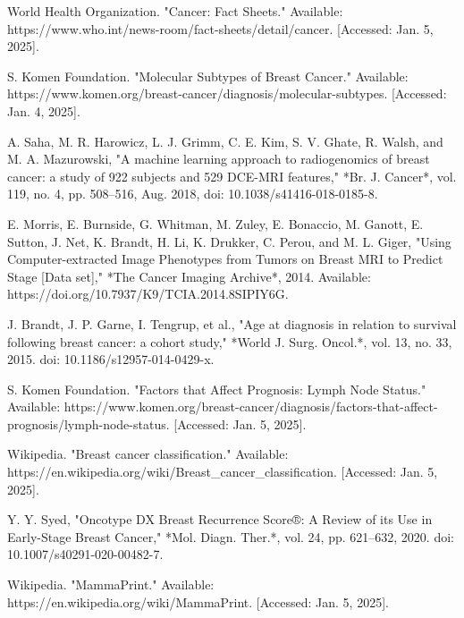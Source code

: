 \documentclass[conference]{IEEEtran}
\begin{document}
\begin{thebibliography}{00}

 World Health Organization. "Cancer: Fact Sheets." Available: https://www.who.int/news-room/fact-sheets/detail/cancer. [Accessed: Jan. 5, 2025].

 S. Komen Foundation. "Molecular Subtypes of Breast Cancer." Available: https://www.komen.org/breast-cancer/diagnosis/molecular-subtypes. [Accessed: Jan. 4, 2025].

 A. Saha, M. R. Harowicz, L. J. Grimm, C. E. Kim, S. V. Ghate, R. Walsh, and M. A. Mazurowski, "A machine learning approach to radiogenomics of breast cancer: a study of 922 subjects and 529 DCE-MRI features," *Br. J. Cancer*, vol. 119, no. 4, pp. 508–516, Aug. 2018, doi: 10.1038/s41416-018-0185-8.

 E. Morris, E. Burnside, G. Whitman, M. Zuley, E. Bonaccio, M. Ganott, E. Sutton, J. Net, K. Brandt, H. Li, K. Drukker, C. Perou, and M. L. Giger, "Using Computer-extracted Image Phenotypes from Tumors on Breast MRI to Predict Stage [Data set]," *The Cancer Imaging Archive*, 2014. Available: https://doi.org/10.7937/K9/TCIA.2014.8SIPIY6G.

 J. Brandt, J. P. Garne, I. Tengrup, et al., "Age at diagnosis in relation to survival following breast cancer: a cohort study," *World J. Surg. Oncol.*, vol. 13, no. 33, 2015. doi: 10.1186/s12957-014-0429-x.

 S. Komen Foundation. "Factors that Affect Prognosis: Lymph Node Status." Available: https://www.komen.org/breast-cancer/diagnosis/factors-that-affect-prognosis/lymph-node-status. [Accessed: Jan. 5, 2025].

 Wikipedia. "Breast cancer classification." Available: https://en.wikipedia.org/wiki/Breast\_cancer\_classification. [Accessed: Jan. 5, 2025].

 Y. Y. Syed, "Oncotype DX Breast Recurrence Score®: A Review of its Use in Early-Stage Breast Cancer," *Mol. Diagn. Ther.*, vol. 24, pp. 621–632, 2020. doi: 10.1007/s40291-020-00482-7.

 Wikipedia. "MammaPrint." Available: https://en.wikipedia.org/wiki/MammaPrint. [Accessed: Jan. 5, 2025].

\end{thebibliography}
\end{document}
